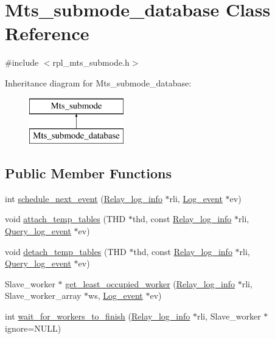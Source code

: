 \hypertarget{classMts__submode__database}{}\section{Mts\+\_\+submode\+\_\+database Class Reference}
\label{classMts__submode__database}


{\ttfamily \#include $<$rpl\+\_\+mts\+\_\+submode.\+h$>$}

Inheritance diagram for Mts\+\_\+submode\+\_\+database\+:\begin{figure}[H]
\begin{center}
\leavevmode
\includegraphics[height=2.000000cm]{classMts__submode__database}
\end{center}
\end{figure}
\subsection*{Public Member Functions}
\begin{DoxyCompactItemize}
\item 
int \mbox{\hyperlink{classMts__submode__database_afcfa7b9bb57cc0fc5851c5882aec84ba}{schedule\+\_\+next\+\_\+event}} (\mbox{\hyperlink{classRelay__log__info}{Relay\+\_\+log\+\_\+info}} $\ast$rli, \mbox{\hyperlink{classLog__event}{Log\+\_\+event}} $\ast$ev)
\item 
void \mbox{\hyperlink{classMts__submode__database_abcd2265dce959fd590c45960237b3eea}{attach\+\_\+temp\+\_\+tables}} (T\+HD $\ast$thd, const \mbox{\hyperlink{classRelay__log__info}{Relay\+\_\+log\+\_\+info}} $\ast$rli, \mbox{\hyperlink{classQuery__log__event}{Query\+\_\+log\+\_\+event}} $\ast$ev)
\item 
void \mbox{\hyperlink{classMts__submode__database_a25224ffe29bd078e228f5d43c7d7ed0f}{detach\+\_\+temp\+\_\+tables}} (T\+HD $\ast$thd, const \mbox{\hyperlink{classRelay__log__info}{Relay\+\_\+log\+\_\+info}} $\ast$rli, \mbox{\hyperlink{classQuery__log__event}{Query\+\_\+log\+\_\+event}} $\ast$ev)
\item 
Slave\+\_\+worker $\ast$ \mbox{\hyperlink{classMts__submode__database_a16f0e272b7a37929ff5659fc88ed0643}{get\+\_\+least\+\_\+occupied\+\_\+worker}} (\mbox{\hyperlink{classRelay__log__info}{Relay\+\_\+log\+\_\+info}} $\ast$rli, Slave\+\_\+worker\+\_\+array $\ast$ws, \mbox{\hyperlink{classLog__event}{Log\+\_\+event}} $\ast$ev)
\item 
int \mbox{\hyperlink{classMts__submode__database_a342d0daf687f50f362ddc86f767da9d0}{wait\+\_\+for\+\_\+workers\+\_\+to\+\_\+finish}} (\mbox{\hyperlink{classRelay__log__info}{Relay\+\_\+log\+\_\+info}} $\ast$rli, Slave\+\_\+worker $\ast$ignore=N\+U\+LL)
\end{DoxyCompactItemize}

